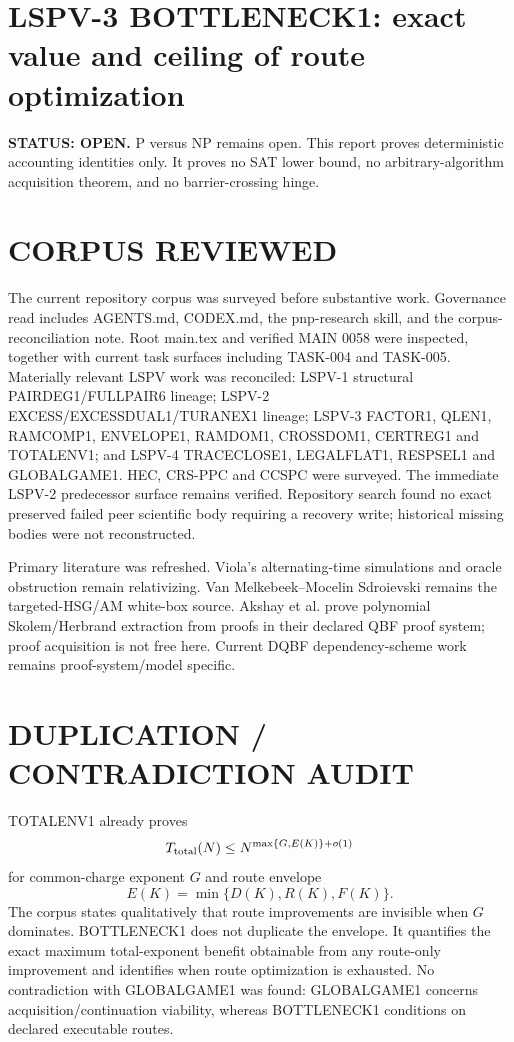 \documentclass[11pt]{article}
\begin{document}
\section*{LSPV-3 BOTTLENECK1: exact value and ceiling of route optimization}
\textbf{STATUS: OPEN.} P versus NP remains open. This report proves deterministic accounting identities only. It proves no SAT lower bound, no arbitrary-algorithm acquisition theorem, and no barrier-crossing hinge.

\section*{CORPUS REVIEWED}
The current repository corpus was surveyed before substantive work. Governance read includes AGENTS.md, CODEX.md, the pnp-research skill, and the corpus-reconciliation note. Root main.tex and verified MAIN 0058 were inspected, together with current task surfaces including TASK-004 and TASK-005. Materially relevant LSPV work was reconciled: LSPV-1 structural PAIRDEG1/FULLPAIR6 lineage; LSPV-2 EXCESS/EXCESSDUAL1/TURANEX1 lineage; LSPV-3 FACTOR1, QLEN1, RAMCOMP1, ENVELOPE1, RAMDOM1, CROSSDOM1, CERTREG1 and TOTALENV1; and LSPV-4 TRACECLOSE1, LEGALFLAT1, RESPSEL1 and GLOBALGAME1. HEC, CRS-PPC and CCSPC were surveyed. The immediate LSPV-2 predecessor surface remains verified. Repository search found no exact preserved failed peer scientific body requiring a recovery write; historical missing bodies were not reconstructed.

Primary literature was refreshed. Viola's alternating-time simulations and oracle obstruction remain relativizing. Van Melkebeek--Mocelin Sdroievski remains the targeted-HSG/AM white-box source. Akshay et al. prove polynomial Skolem/Herbrand extraction from proofs in their declared QBF proof system; proof acquisition is not free here. Current DQBF dependency-scheme work remains proof-system/model specific.

\section*{DUPLICATION / CONTRADICTION AUDIT}
TOTALENV1 already proves
\[
T_{\rm total}(N)\le N^{\max\{G,E(K)\}+o(1)}
\]
for common-charge exponent \(G\) and route envelope
\[
E(K)=\min\{D(K),R(K),F(K)\}.
\]
The corpus states qualitatively that route improvements are invisible when \(G\) dominates. BOTTLENECK1 does not duplicate the envelope. It quantifies the exact maximum total-exponent benefit obtainable from any route-only improvement and identifies when route optimization is exhausted. No contradiction with GLOBALGAME1 was found: GLOBALGAME1 concerns acquisition/continuation viability, whereas BOTTLENECK1 conditions on declared executable routes.
\end{document}
